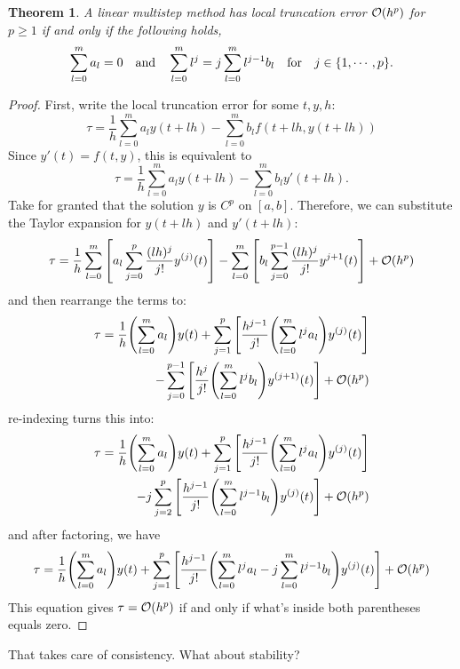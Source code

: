 \documentclass{article}
\newtheorem{theorem}{Theorem}[section]
\newcommand{\0}{\vb{0}}
\begin{document}
\begin{theorem}
  A linear multistep method has local truncation error $\order{h^p}$ for $p \geq 1$ if and only if the following holds,
  \[\sum_{l=0}^ma_l = 0 \qq{and} \sum_{l=0}^ml^j = j\sum_{l=0}^ml^{j-1}b_l \qq{for} j \in \{1,\cdots, p\}.\]
\end{theorem}
\begin{proof}
  First, write the local truncation error for some $t, y, h$:
  \[\tau = \frac{1}{h}\sum_{l=0}^ma_ly(t + lh) - \sum_{l=0}^mb_lf(t+lh, y(t+lh))\]
  Since $y'(t) = f(t, y)$, this is equivalent to
  \[\tau = \frac{1}{h}\sum_{l=0}^ma_ly(t + lh) - \sum_{l=0}^mb_ly'(t + lh).\]
  Take for granted that the solution $y$ is $C^p$ on $[a, b]$. Therefore, we can substitute the Taylor expansion for $y(t + lh)$ and $y'(t+lh)$:
  \[\tau = \frac{1}{h}\sum_{l=0}^m\qty[a_l\sum_{j=0}^p\frac{(lh)^j}{j!}y^{(j)}(t)] - \sum_{l=0}^m\qty[b_l\sum_{j=0}^{p-1}\frac{(lh)^j}{j!}y^{j+1}(t)] + \order{h^p}\]
  and then rearrange the terms to:
  \begin{align*}
    \tau = \frac{1}{h}\qty(\sum_{l=0}^{m}a_l)y(t) + \sum_{j=1}^p\qty[\frac{h^{j-1}}{j!}\qty(\sum_{l=0}^ml^ja_l)y^{(j)}(t)]\\ - \sum_{j=0}^{p-1}\qty[\frac{h^j}{j!}\qty(\sum_{l=0}^ml^jb_l)y^{(j+1)}(t)]+\order{h^p}
  \end{align*}
  re-indexing turns this into:
  \begin{align*}
    \tau = \frac{1}{h}\qty(\sum_{l=0}^{m}a_l)y(t) + \sum_{j=1}^p\qty[\frac{h^{j-1}}{j!}\qty(\sum_{l=0}^ml^ja_l)y^{(j)}(t)]\\ - j\sum_{j=2}^{p}\qty[\frac{h^{j-1}}{j!}\qty(\sum_{l=0}^ml^{j-1}b_l)y^{(j)}(t)]+\order{h^p}
  \end{align*}
  and after factoring, we have
  \[\tau = \frac{1}{h}\qty(\sum_{l=0}^ma_l)y(t) + \sum_{j=1}^p\qty[\frac{h^{j-1}}{j!}\qty(\sum_{l=0}^ml^ja_l - j\sum_{l=0}^ml^{j-1}b_l)y^{(j)}(t)] + \order{h^p}\]
  This equation gives $\tau = \order{h^p}$ if and only if what's inside both parentheses equals zero.
\end{proof}

That takes care of consistency. What about stability?
\end{document}
